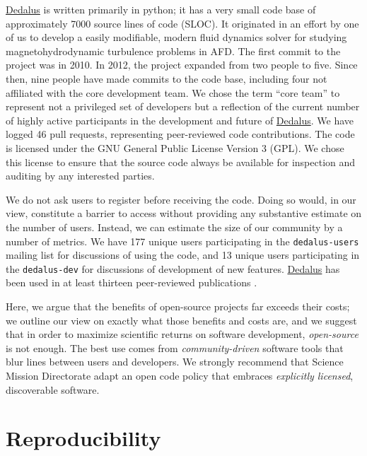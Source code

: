 \documentclass[12pt, titlepage]{aastex62}
\newcommand{\dedalus}{\href{http://dedalus-project.org}{Dedalus}}
\begin{document}
\dedalus{} is written primarily in python; it has a very small code base of approximately 7000 source lines of code (SLOC). It originated in an effort by one of us to develop a easily modifiable, modern fluid dynamics solver for studying magnetohydrodynamic turbulence problems in AFD. The first commit to the project was in 2010. In 2012, the project expanded from two people to five. Since then, nine people have made commits to the code base, including four not affiliated with the core development team. We chose the term ``core team'' to represent not a privileged set of developers but a reflection of the current number of highly active participants in the development and future of \dedalus{}. We have logged 46 pull requests, representing peer-reviewed code contributions. The code is licensed under the GNU General Public License Version 3 (GPL). We chose this license to ensure that the source code always be available for inspection and auditing by any interested parties. 

We do not ask users to register before receiving the code. Doing so would, in our view, constitute a barrier to access without providing any substantive estimate on the number of users. Instead, we can estimate the size of our community by a number of metrics. We have 177 unique users participating in the \texttt{dedalus-users} mailing list for discussions of using the code, and 13 unique users participating in the \texttt{dedalus-dev} for discussions of development of new features. \dedalus{} has been used in at least thirteen peer-reviewed publications \citep{2018Bordwell,2017PhRvF...2h3501A,PhysRevFluids.2.094804,2017ApJ...841....1C,2017ApJ...841....2C,2017MNRAS.466.2181L,2016ApJ...832...71L,2016JCoPh.325...53V,2016PhRvE..94e3206D,2016PhRvL.116j5004D,2016MNRAS.455.4274L,2015PhRvE..91f3016L,2014ApJ...797...94L}.

Here, we argue that the benefits of open-source projects far exceeds their costs; we outline our view on exactly what those benefits and costs are, and we suggest that in order to maximize scientific returns on software development, \emph{open-source} is not enough. The best use comes from \emph{community-driven} software tools that blur lines between users and developers. We strongly recommend that Science Mission Directorate adapt an open code policy that embraces \emph{explicitly licensed}, discoverable software. 

\section{Reproducibility}
\label{sec:repro}
\end{document}
